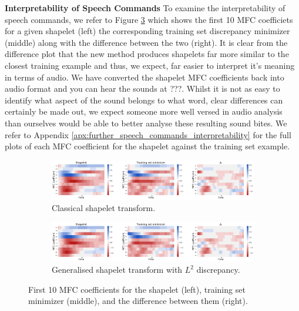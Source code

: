 \documentclass{article}
\theoremstyle{plain}
\theoremstyle{definition}
\newcommand{\boldheading}[1]{

\textbf{#1}\quad}
\begin{document}
\boldheading{Interpretability of Speech Commands}
To examine the interpretability of speech commands, we refer to Figure \ref{fig:speech_commands} which shows the first 10 MFC coefficiets for a given shapelet (left) the corresponding training set discrepancy minimizer (middle) along with the difference between the two (right). It is clear from the difference plot that the new method produces shapelets far more similar to the closest training example and thus, we expect, far easier to interpret it's meaning in terms of audio. We have converted the shapelet MFC coefficients back into audio format and you can hear the sounds at ???. Whilst it is not as easy to identify what aspect of the sound belongs to what word, clear differences can certainly be made out, we expect someone more well versed in audio analysis than ourselves would be able to better analyse these resulting sound bites. We refer to Appendix \ref{apx:further_speech_commands_interpretability} for the full plots of each MFC coefficient for the shapelet against the training set example.
	\begin{figure}[t]
		\begin{subfigure}[b]{\linewidth}
			\centering
			\includegraphics[width=\linewidth]{images/old_speech_commands_heatmap.png}
			\caption{Classical shapelet transform.}
			\label{fig:old_speech_commands}
		\end{subfigure}
		\begin{subfigure}[b]{\linewidth}
			\centering
			\includegraphics[width=\linewidth]{images/new_speech_commands_heatmap.png}
			\caption{Generalised shapelet transform with $L^2$ discrepancy.}
			\label{fig:new_speech_commands}
		\end{subfigure}
		\caption{First 10 MFC coefficients for the shapelet (left), training set minimizer (middle), and the difference between them (right).}
		\label{fig:speech_commands}
	\end{figure}
\end{document}
